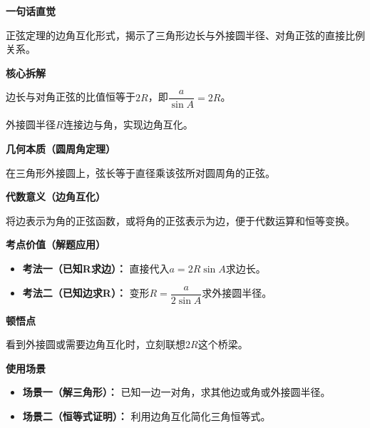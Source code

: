 \begin{explanationbox}
	\textbf{\textcolor{CExplanation}{一句话直觉}}

	正弦定理的边角互化形式，揭示了三角形边长与外接圆半径、对角正弦的直接比例关系。

	\medskip
	\textbf{\textcolor{CExplanation}{核心拆解}}
	\begin{description}[style=nextline, leftmargin=2.8em, labelsep=0.5em, itemsep=0.45em]
		\item[\textbf{要点一（比例关系）：}] 边长与对角正弦的比值恒等于$2R$，即$\dfrac{a}{\sin A}=2R$。
		\item[\textbf{要点二（半径桥梁）：}] 外接圆半径$R$连接边与角，实现边角互化。
	\end{description}

	\medskip
	\textbf{\textcolor{CExplanation}{几何本质（圆周角定理）}}

	在三角形外接圆上，弦长等于直径乘该弦所对圆周角的正弦。

	\medskip
	\textbf{\textcolor{CExplanation}{代数意义（边角互化）}}

	将边表示为角的正弦函数，或将角的正弦表示为边，便于代数运算和恒等变换。

	\medskip
	\textbf{\textcolor{CExplanation}{考点价值（解题应用）}}
	\begin{itemize}[leftmargin=*, itemsep=0.5em, topsep=0.4em]
		\item \textbf{考法一（已知R求边）：} 直接代入$a=2R\sin A$求边长。
		\item \textbf{考法二（已知边求R）：} 变形$R=\dfrac{a}{2\sin A}$求外接圆半径。
	\end{itemize}

	\medskip
	\textbf{\textcolor{CExplanation}{顿悟点}}

	看到外接圆或需要边角互化时，立刻联想$2R$这个桥梁。

	\medskip
	\textbf{\textcolor{CExplanation}{使用场景}}
	\begin{itemize}[leftmargin=*, itemsep=0.5em, topsep=0.4em]
		\item \textbf{场景一（解三角形）：} 已知一边一对角，求其他边或角或外接圆半径。
		\item \textbf{场景二（恒等式证明）：} 利用边角互化简化三角恒等式。
	\end{itemize}
\end{explanationbox}
